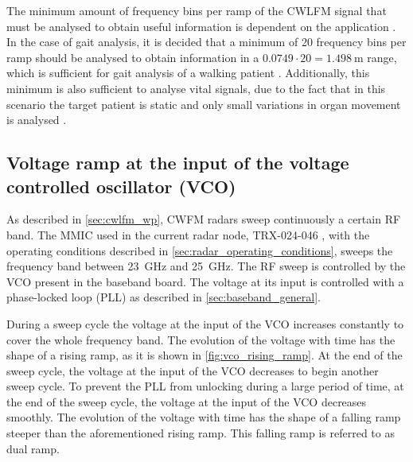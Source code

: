 The minimum amount of frequency bins per ramp of the CWLFM signal that must be analysed to obtain useful information is dependent on the application \cite{Richards2010}. In the case of gait analysis, it is decided that a minimum of 20 frequency bins per ramp should be analysed to obtain information in a $0.0749 \cdot 20 = \SI{1.498}{\metre}$ range, which is sufficient for gait analysis of a walking patient \cite{Amin2017, Richards2010}. Additionally, this minimum is also sufficient to analyse vital signals, due to the fact that in this scenario the target patient is static and only small variations in organ movement is analysed \cite{Amin2017}.




\subsection{Voltage ramp at the input of the voltage controlled oscillator (VCO)}  \label{sec:vco_characterisation}

As described in \cref{sec:cwlfm_wp}, CWFM radars sweep continuously a certain RF band. The MMIC used in the current radar node, TRX-024-046 \cite{SR2021}, with the operating conditions described in \cref{sec:radar_operating_conditions}, sweeps the frequency band between \SI{23}{\giga\hertz} and \SI{25}{\giga\hertz}. The RF sweep is controlled by the VCO present in the baseband board. The voltage at its input is controlled with a phase-locked loop (PLL) as described in \cref{sec:baseband_general}.

During a sweep cycle the voltage at the input of the VCO increases constantly to cover the whole frequency band. The evolution of the voltage with time has the shape of a rising ramp, as it is shown in \cref{fig:vco_rising_ramp}. At the end of the sweep cycle, the voltage at the input of the VCO decreases to begin another sweep cycle. To prevent the PLL from unlocking during a large period of time, at the end of the sweep cycle, the voltage at the input of the VCO decreases smoothly. The evolution of the voltage with time has the shape of a falling ramp steeper than the aforementioned rising ramp. This falling ramp is referred to as dual ramp.

